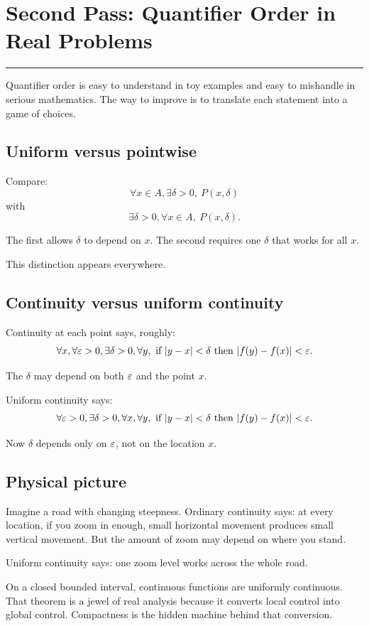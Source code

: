 \documentclass[12pt]{article}
\newcommand{\chapterline}{\vspace{0.4em}\hrule\vspace{0.8em}}
\begin{document}
\newpage
\section{Second Pass: Quantifier Order in Real Problems}
\chapterline

Quantifier order is easy to understand in toy examples and easy to mishandle in serious mathematics. The way to improve is to translate each statement into a game of choices.

\subsection{Uniform versus pointwise}

Compare:
\[
\forall x\in A,\exists \delta>0,\ P(x,\delta)
\]
with
\[
\exists \delta>0,\forall x\in A,\ P(x,\delta).
\]

The first allows $\delta$ to depend on $x$. The second requires one $\delta$ that works for all $x$.

This distinction appears everywhere.

\subsection{Continuity versus uniform continuity}

Continuity at each point says, roughly:
\[
\forall x,\forall \varepsilon>0,\exists \delta>0,\forall y,\text{ if }|y-x|<\delta\text{ then }|f(y)-f(x)|<\varepsilon.
\]

The $\delta$ may depend on both $\varepsilon$ and the point $x$.

Uniform continuity says:
\[
\forall \varepsilon>0,\exists \delta>0,\forall x,\forall y,\text{ if }|y-x|<\delta\text{ then }|f(y)-f(x)|<\varepsilon.
\]

Now $\delta$ depends only on $\varepsilon$, not on the location $x$.

\subsection{Physical picture}

Imagine a road with changing steepness. Ordinary continuity says: at every location, if you zoom in enough, small horizontal movement produces small vertical movement. But the amount of zoom may depend on where you stand.

Uniform continuity says: one zoom level works across the whole road.

On a closed bounded interval, continuous functions are uniformly continuous. That theorem is a jewel of real analysis because it converts local control into global control. Compactness is the hidden machine behind that conversion.
\end{document}
